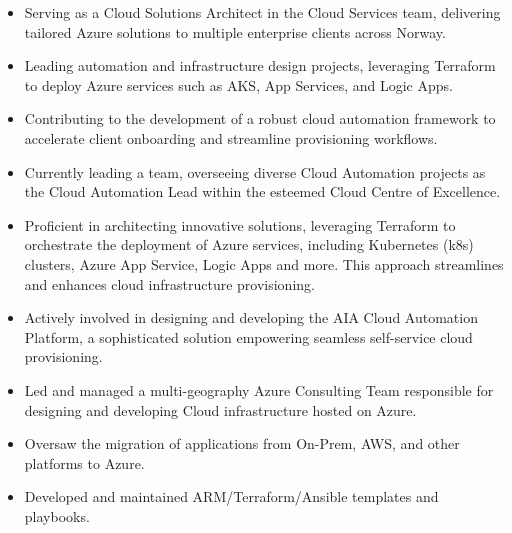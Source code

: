 \documentclass[10pt,a4paper]{altacv}
\begin{document}
\begin{itemize}
\item Serving as a Cloud Solutions Architect in the Cloud Services team, delivering tailored Azure solutions to multiple enterprise clients across Norway.
\item Leading automation and infrastructure design projects, leveraging Terraform to deploy Azure services such as AKS, App Services, and Logic Apps.
\item Contributing to the development of a robust cloud automation framework to accelerate client onboarding and streamline provisioning workflows.
\end{itemize}
\vspace{.2cm}
\begin{itemize}
\item Currently leading a team, overseeing diverse Cloud Automation projects as the Cloud Automation Lead within the esteemed Cloud Centre of Excellence.
\item Proficient in architecting innovative solutions, leveraging Terraform to orchestrate the deployment of Azure services, including Kubernetes (k8s) clusters, Azure App Service, Logic Apps and more. This approach streamlines and enhances cloud infrastructure provisioning.
\item Actively involved in designing and developing the AIA Cloud Automation Platform, a sophisticated solution empowering seamless self-service cloud provisioning.
\end{itemize}
\vspace{.2cm}
\begin{itemize}
\item Led and managed a multi-geography Azure Consulting Team responsible for designing and developing Cloud infrastructure hosted on Azure.
\item Oversaw the migration of applications from On-Prem, AWS, and other platforms to Azure.
\item Developed and maintained ARM/Terraform/Ansible templates and playbooks.
\end{itemize}
\vspace{.2cm}
\end{document}
